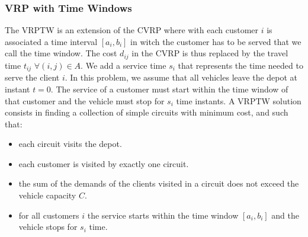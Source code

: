 \subsubsection{VRP with Time Windows}
The VRPTW is an extension of the CVRP where with each customer $i$ is associated a time interval $[a_i, b_i]$ in witch the customer has to be served that we call the time window. The cost $d_{ij}$ in the CVRP is thus replaced by the travel time $t_{ij}$ $\forall (i,j) \in A$. We add a service time $s_i$  that represents the time needed to serve the client $i$. In this problem, we assume that all vehicles leave the depot at instant $t=0$. The service of a customer must start within the time window of that customer and the vehicle must stop for $s_i$ time instants.
A VRPTW solution consists in finding a collection of simple circuits with minimum cost, and such that:
\begin{itemize}
	\item each circuit visits the depot.
	\item each customer is visited by exactly one circuit.
	\item the sum of the demands of the clients visited in a circuit does not exceed the vehicle capacity $C$.
	\item for all customers $ i $ the service starts within the time window $[a_i, b_i]$ and the vehicle stops for $s_i$ time.
\end{itemize}